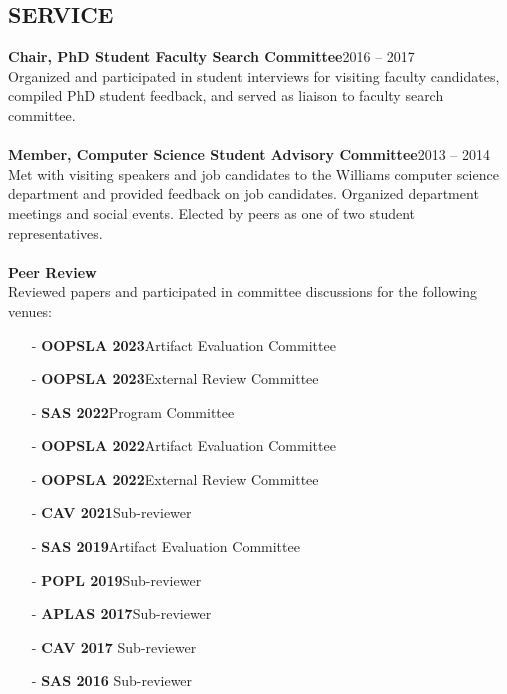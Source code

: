 \documentclass[margin]{res}
\begin{document}
\begin{resume}
\section{SERVICE}
{\bf Chair, PhD Student Faculty Search Committee}\hfill{2016 -- 2017}\\
Organized and participated in student interviews for visiting faculty candidates, compiled PhD student feedback, and served as liaison to faculty search committee.\\\\
{\bf Member, Computer Science Student Advisory Committee}\hfill{2013 -- 2014}\\
Met with visiting speakers and job candidates to the Williams computer science department and provided feedback on job candidates.  Organized department meetings and social events.  Elected by peers as one of two student representatives.\\\\
{\bf Peer Review}\\
Reviewed papers and participated in committee discussions for the following venues:
\begin{itemize}[topsep=0.5em]
\item[-] {\bf OOPSLA 2023}\hfill Artifact Evaluation Committee
\item[-] {\bf OOPSLA 2023}\hfill External Review Committee
\item[-] {\bf SAS 2022}\hfill Program Committee
\item[-] {\bf OOPSLA 2022}\hfill Artifact Evaluation Committee
\item[-] {\bf OOPSLA 2022}\hfill External Review Committee
\item[-] {\bf CAV 2021}\hfill Sub-reviewer
\item[-] {\bf SAS 2019}\hfill Artifact Evaluation Committee
\item[-] {\bf POPL 2019}\hfill Sub-reviewer
\item[-] {\bf APLAS 2017}\hfill Sub-reviewer
\item[-] {\bf CAV 2017} \hfill Sub-reviewer
\item[-] {\bf SAS 2016} \hfill Sub-reviewer
\end{itemize}
\end{resume}
\end{document}
